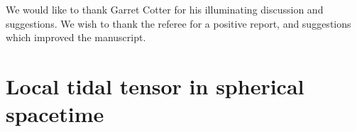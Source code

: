 \documentclass[
    reprint,
    prd,
    nofootinbib,
    amsmath,amssymb,
    aps,
    floatfix,
]{revtex4-2}
\begin{document}

\begin{acknowledgments}
    We would like to thank Garret Cotter for his illuminating discussion and suggestions. We wish to thank the referee for a positive report, and suggestions which improved the manuscript. 
\end{acknowledgments}



\appendix
\section{Local tidal tensor in spherical spacetime}\label{sec:app}
\end{document}
